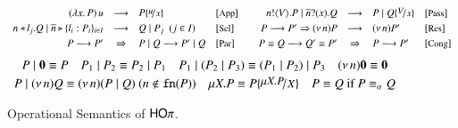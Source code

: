\begin{figure}[!t]
\[
	\begin{array}{rcllcrcll}
		\appl{(\abs{x}{P})}{u}  & \red & P \subst{u}{x} 
		& \orule{App}
		&&
		\bout{n}{V} P \Par \binp{\dual{n}}{x} Q & \red & P \Par Q \subst{V}{x} 
		& \orule{Pass}
		\\[1mm]

		\bsel{n}{l_j} Q \Par \bbra{\dual{n}}{l_i : P_i}_{i \in I} & \red & Q \Par P_j ~~(j \in I)~~ 
		& \orule{Sel}
		&&
		P \red P'\Rightarrow  \news{n} P   & \red  &  \news{n} P' 
		& \orule{Res}
		\\[1mm]

		P \red P' & \Rightarrow  &  P \Par Q  \red   P' \Par Q  
		& \orule{Par}
		&&
		P \scong Q \red Q' \scong P' & \Rightarrow & P  \red  P'
		& \orule{Cong}
	\end{array}
\]
{\small
\[
	\begin{array}{c}
		P \Par \inact \scong P
		\quad
		P_1 \Par P_2 \scong P_2 \Par P_1
		\quad
		P_1 \Par (P_2 \Par P_3) \scong (P_1 \Par P_2) \Par P_3
		\quad
		\news{n} \inact \scong \inact
		\\[1mm]
		P \Par \news{n} Q \scong \news{n}(P \Par Q)
		\ (n \notin \fn{P})
		\quad 
		\recp{X}{P} \scong P\subst{\recp{X}{P}}{\rvar{X}}
		\quad
		P \scong Q \textrm{ if } P \scong_\alpha Q
	\end{array}
\]
}
\caption{Operational Semantics of $\mathsf{HO}\pi$. 
\label{fig:reduction}}
\end{figure}

